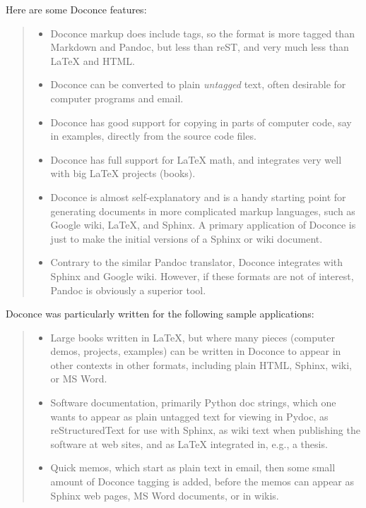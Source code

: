 \documentclass[a4paper]{article}
\begin{document}
Here are some Doconce features:
%
\begin{quote}
%
\begin{itemize}

\item Doconce markup does include tags, so the format is more tagged than
Markdown and Pandoc, but less than reST, and very much less than
LaTeX and HTML.

\item Doconce can be converted to plain \emph{untagged} text,
often desirable for computer programs and email.

\item Doconce has good support for copying in parts of computer code,
say in examples, directly from the source code files.

\item Doconce has full support for LaTeX math, and integrates very well
with big LaTeX projects (books).

\item Doconce is almost self-explanatory and is a handy starting point
for generating documents in more complicated markup languages, such
as Google wiki, LaTeX, and Sphinx. A primary application of Doconce
is just to make the initial versions of a Sphinx or wiki document.

\item Contrary to the similar Pandoc translator, Doconce integrates with
Sphinx and Google wiki. However, if these formats are not of interest,
Pandoc is obviously a superior tool.

\end{itemize}

\end{quote}

Doconce was particularly written for the following sample applications:
%
\begin{quote}
%
\begin{itemize}

\item Large books written in LaTeX, but where many pieces (computer demos,
projects, examples) can be written in Doconce to appear in other
contexts in other formats, including plain HTML, Sphinx, wiki, or MS Word.

\item Software documentation, primarily Python doc strings, which one wants
to appear as plain untagged text for viewing in Pydoc, as reStructuredText
for use with Sphinx, as wiki text when publishing the software at
web sites, and as LaTeX integrated in, e.g., a thesis.

\item Quick memos, which start as plain text in email, then some small
amount of Doconce tagging is added, before the memos can appear as
Sphinx web pages, MS Word documents, or in wikis.

\end{itemize}

\end{quote}
\end{document}
